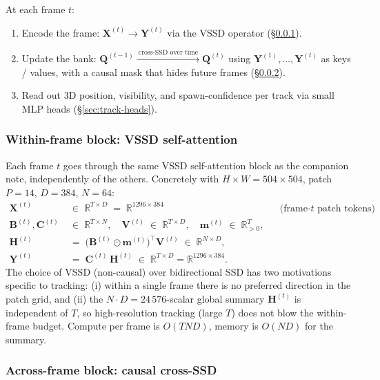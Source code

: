 \documentclass[11pt,a4paper]{article}
\begin{document}
At each frame $t$:

\begin{enumerate}
  \item Encode the frame: $\bm{X}^{(t)} \to \bm{Y}^{(t)}$ via the
        VSSD operator (\S\ref{sec:track-self}).
  \item Update the bank: $\bm{Q}^{(t-1)} \xrightarrow{~\text{cross-SSD over time}~} \bm{Q}^{(t)}$
        using $\bm{Y}^{(1)},\dots,\bm{Y}^{(t)}$ as keys / values, with
        a causal mask that hides future frames
        (\S\ref{sec:track-cross}).
  \item Read out 3D position, visibility, and spawn-confidence per
        track via small MLP heads (\S\ref{sec:track-heads}).
\end{enumerate}

\subsubsection{Within-frame block: VSSD self-attention}
\label{sec:track-self}

Each frame $t$ goes through the same VSSD self-attention block as
the companion note, independently of the others. Concretely
with $H\!\times\!W = 504\!\times\!504$, patch $P=14$, $D=384$,
$N=64$:
\begin{align}
  \bm{X}^{(t)} &\;\in\; \mathbb{R}^{T\times D} \;=\; \mathbb{R}^{1296\times 384}
  &&\text{(frame-$t$ patch tokens)}, \\
  \bm{B}^{(t)},\bm{C}^{(t)} &\;\in\; \mathbb{R}^{T\times N}, \quad
  \bm{V}^{(t)} \;\in\; \mathbb{R}^{T\times D}, \quad
  \bm{m}^{(t)} \;\in\; \mathbb{R}_{>0}^{T}, \\
  \bm{H}^{(t)} &\;=\; \bigl(\bm{B}^{(t)}\odot\bm{m}^{(t)}\bigr)^\top\bm{V}^{(t)}
  \;\in\; \mathbb{R}^{N\times D}, \\
  \bm{Y}^{(t)} &\;=\; \bm{C}^{(t)}\,\bm{H}^{(t)}
  \;\in\; \mathbb{R}^{T\times D} = \mathbb{R}^{1296\times 384}.
\end{align}
The choice of VSSD (non-causal) over bidirectional SSD has two
motivations specific to tracking: (i) within a single frame there is
no preferred direction in the patch grid, and (ii) the $N\!\cdot\!D
= 24\,576$-scalar global summary $\bm{H}^{(t)}$ is independent of
$T$, so high-resolution tracking (large $T$) does not blow the
within-frame budget. Compute per frame is $O(TND)$, memory is
$O(ND)$ for the summary.

\subsubsection{Across-frame block: causal cross-SSD}
\label{sec:track-cross}
\end{document}
